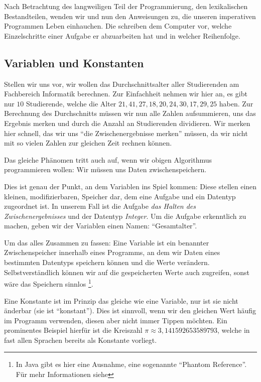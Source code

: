 Nach Betrachtung des langweiligen Teil der Programmierung, den lexikalischen Bestandteilen, wenden wir und nun den Anweisungen zu, die unseren imperativen Programmen Leben einhauchen. Die schreiben dem Computer vor, welche Einzelschritte einer Aufgabe er abzuarbeiten hat und in welcher Reihenfolge.

\subsection{Variablen und Konstanten} \imperativeMark \oopMark
	
	Stellen wir uns vor, wir wollen das Durchschnittsalter aller Studierenden am Fachbereich Informatik berechnen. Zur Einfachheit nehmen wir hier an, es gibt nur $ 10 $ Studierende, welche die Alter $ 21, 41, 27, 18, 20, 24, 30, 17, 29, 25 $ haben. Zur Berechnung des Durchschnitts müssen wir nun alle Zahlen aufsummieren, uns das Ergebnis merken und durch die Anzahl an Studierenden dividieren. Wir merken hier schnell, das wir uns \enquote{die Zwischenergebnisse merken} müssen, da wir nicht mit so vielen Zahlen zur gleichen Zeit rechnen können.
	
	Das gleiche Phänomen tritt auch auf, wenn wir obigen Algorithmus programmieren wollen: Wir müssen uns Daten zwischenspeichern.
	
	Dies ist genau der Punkt, an dem Variablen ins Spiel kommen: Diese stellen einen kleinen, modifizierbaren, Speicher dar, dem eine Aufgabe und ein Datentyp zugeordnet ist. In unserem Fall ist die Aufgabe \textit{das Halten des Zwischenergebnisses} und der Datentyp \textit{Integer}. Um die Aufgabe erkenntlich zu machen, geben wir der Variablen einen Namen: \enquote{Gesamtalter}.
	
	Um das alles Zusammen zu fassen: Eine Variable ist ein benannter Zwischenspeicher innerhalb eines Programms, an dem wir Daten eines bestimmten Datentyps speichern können und die Werte verändern. Selbstverständlich können wir auf die gespeicherten Werte auch zugreifen, sonst wäre das Speichern sinnlos \footnote{In Java gibt es hier eine Ausnahme, eine sogenannte \enquote{Phantom Reference}. Für mehr Informationen siehe }.
	
	Eine Konstante ist im Prinzip das gleiche wie eine Variable, nur ist sie nicht änderbar (sie ist \enquote{konstant}). Dies ist sinnvoll, wenn wir den gleichen Wert häufig im Programm verwenden, diesen aber nicht immer Tippen möchten. Ein prominentes Beispiel hierfür ist die Kreiszahl $ \pi \approx 3,141592653589793 $, welche in fast allen Sprachen bereits als Konstante vorliegt.
	
